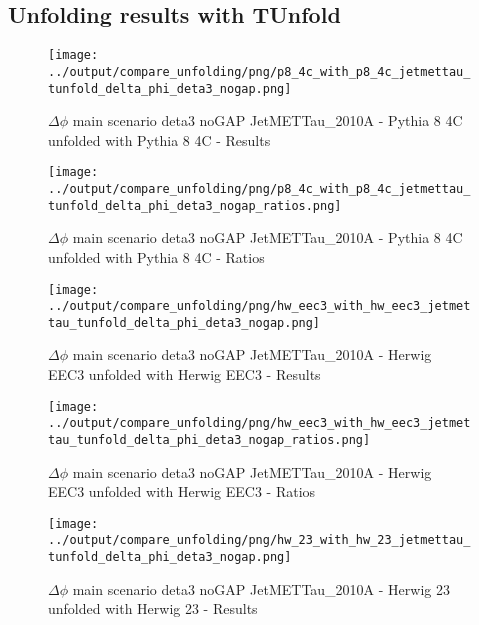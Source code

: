 \documentclass[11pt]{book}
\begin{document}
\clearpage
\subsection{Unfolding results with TUnfold}

\begin{figure}[ht]
\centering
\texttt{[image: ../output/compare\_unfolding/png/p8\_4c\_with\_p8\_4c\_jetmettau\_tunfold\_delta\_phi\_deta3\_nogap.png]}
\caption{$\Delta\phi$ main scenario deta3 noGAP JetMETTau\_2010A - Pythia 8 4C unfolded with Pythia 8 4C - Results}
\label{p8_p8_jetmettau_tunfold_delta_phi_deta3_nogap_a}
\end{figure}

\begin{figure}[ht]
\centering
\texttt{[image: ../output/compare\_unfolding/png/p8\_4c\_with\_p8\_4c\_jetmettau\_tunfold\_delta\_phi\_deta3\_nogap\_ratios.png]}
\caption{$\Delta\phi$ main scenario deta3 noGAP JetMETTau\_2010A - Pythia 8 4C unfolded with Pythia 8 4C - Ratios}
\label{p8_p8_jetmettau_tunfold_delta_phi_deta3_nogap_b}
\end{figure}

\begin{figure}[ht]
\centering
\texttt{[image: ../output/compare\_unfolding/png/hw\_eec3\_with\_hw\_eec3\_jetmettau\_tunfold\_delta\_phi\_deta3\_nogap.png]}
\caption{$\Delta\phi$ main scenario deta3 noGAP JetMETTau\_2010A - Herwig EEC3 unfolded with Herwig EEC3 - Results}
\label{hw_eec3_hw_eec3_jetmettau_tunfold_delta_phi_deta3_nogap_a}
\end{figure}

\begin{figure}[ht]
\centering
\texttt{[image: ../output/compare\_unfolding/png/hw\_eec3\_with\_hw\_eec3\_jetmettau\_tunfold\_delta\_phi\_deta3\_nogap\_ratios.png]}
\caption{$\Delta\phi$ main scenario deta3 noGAP JetMETTau\_2010A - Herwig EEC3 unfolded with Herwig EEC3 - Ratios}
\label{hw_eec3_hw_eec3_jetmettau_tunfold_delta_phi_deta3_nogap_b}
\end{figure}

\begin{figure}[ht]
\centering
\texttt{[image: ../output/compare\_unfolding/png/hw\_23\_with\_hw\_23\_jetmettau\_tunfold\_delta\_phi\_deta3\_nogap.png]}
\caption{$\Delta\phi$ main scenario deta3 noGAP JetMETTau\_2010A - Herwig 23 unfolded with Herwig 23 - Results}
\label{hw_23_hw_23_jetmettau_tunfold_delta_phi_deta3_nogap_a}
\end{figure}
\end{document}
